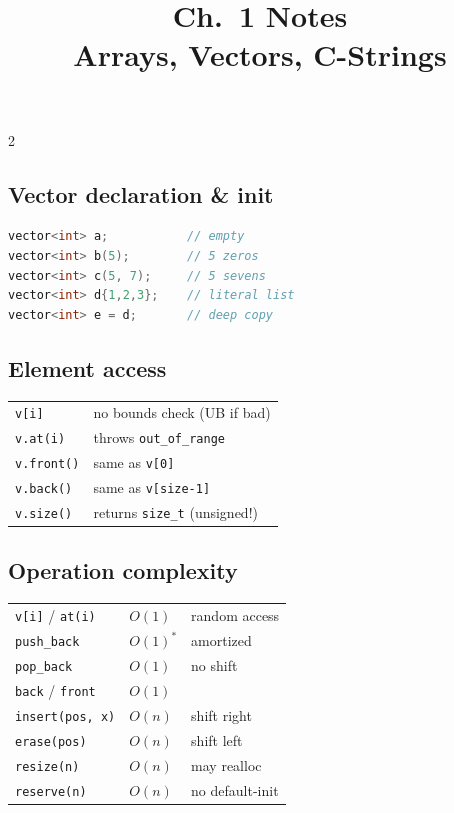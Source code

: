 \documentclass[10pt]{article}
\title{Ch.~1 Notes\\\large Arrays, Vectors, C-Strings}
\author{}
\date{}
\begin{document}
\maketitle
\vspace{-2em}

\begin{multicols}{2}

\subsection*{Vector declaration \& init}
\begin{lstlisting}[language=C++]
vector<int> a;           // empty
vector<int> b(5);        // 5 zeros
vector<int> c(5, 7);     // 5 sevens
vector<int> d{1,2,3};    // literal list
vector<int> e = d;       // deep copy
\end{lstlisting}

\subsection*{Element access}
\begin{tabular}{@{}ll@{}}
\texttt{v[i]}        & no bounds check (UB if bad)\\
\texttt{v.at(i)}     & throws \texttt{out\_of\_range}\\
\texttt{v.front()}   & same as \texttt{v[0]}\\
\texttt{v.back()}    & same as \texttt{v[size-1]}\\
\texttt{v.size()}    & returns \texttt{size\_t} (unsigned!)
\end{tabular}

\subsection*{Operation complexity}
\begin{tabular}{@{}lll@{}}
\texttt{v[i]} / \texttt{at(i)}   & $O(1)$    & random access\\
\texttt{push\_back}              & $O(1)^*$  & amortized\\
\texttt{pop\_back}               & $O(1)$    & no shift\\
\texttt{back} / \texttt{front}   & $O(1)$    & \\
\texttt{insert(pos, x)}          & $O(n)$    & shift right\\
\texttt{erase(pos)}              & $O(n)$    & shift left\\
\texttt{resize(n)}               & $O(n)$    & may realloc\\
\texttt{reserve(n)}              & $O(n)$    & no default-init
\end{tabular}


\end{multicols}
\end{document}
